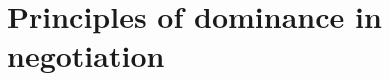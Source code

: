 \documentclass{article}
\begin{document}
	\section{Principles of dominance in negotiation}
	
	
	
\end{document}
